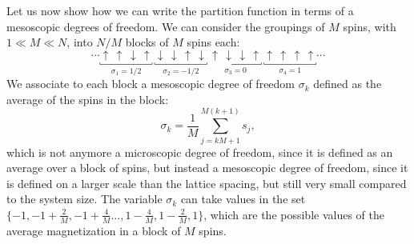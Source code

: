 Let us now show how we can write the partition function in terms of a mesoscopic degrees of freedom. We can consider the groupings of \(M\) spins, with \(1 \ll M \ll N\), into \(N/M\) blocks of \(M\) spins each:
\[
    \cdots \underbracket{\uparrow \, \uparrow \, \downarrow \, \uparrow}_{\sigma_1 = 1/2}\, \underbracket{\downarrow \,\downarrow \, \uparrow \, \downarrow}_{\sigma_2 = -1/2}\, \underbracket{\uparrow \, \downarrow \, \downarrow \, \uparrow}_{\sigma_3 = 0}\, \underbracket{\uparrow \, \uparrow \, \uparrow \,\uparrow}_{\sigma_4 = 1} \cdots
\]
We associate to each block a mesoscopic degree of freedom \(\sigma_k\) defined as the average of the spins in the block:
\[
    \sigma_k = \frac{1}{M} \sum_{j = kM + 1}^{M(k+1)} s_j,
\]
which is not anymore a microscopic degree of freedom, since it is defined as an average over a block of spins, but instead a mesoscopic degree of freedom, since it is defined on a larger scale than the lattice spacing, but still very small compared to the system size. The variable \(\sigma_k\) can take values in the set \(\{-1, -1 + \frac{2}{M}, -1 + \frac{4}{M} \dots, 1 - \frac{4}{M}, 1 - \frac{2}{M}, 1\}\), which are the possible values of the average magnetization in a block of \(M\) spins.

